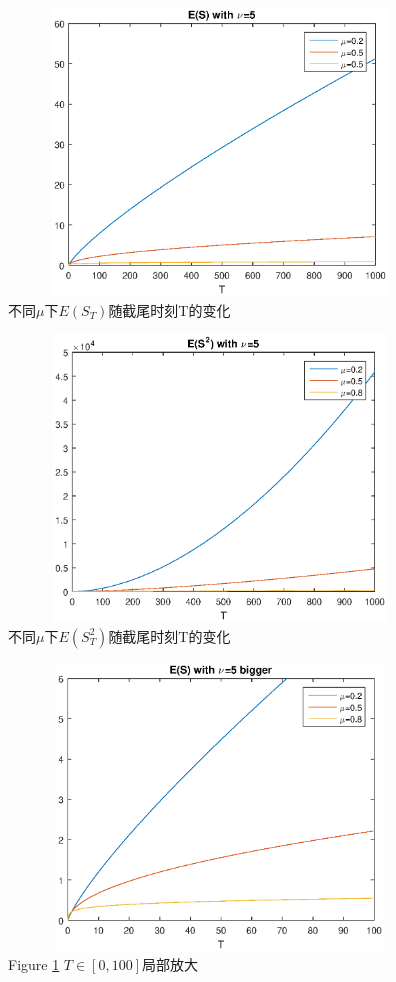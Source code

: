 \documentclass[a4paper, 12pt]{ctexart}
\begin{document}
\begin{figure}[H]
\centering
\includegraphics[width=5in,height=3in]{ES.eps}
\caption{不同$\mu$下$E(S_T)$随截尾时刻T的变化}
\label{fig:4}
\end{figure}
\bigskip


\begin{figure}[H]
\centering
\includegraphics[width=5in,height=3in]{ES2.eps}
\caption{不同$\mu$下$E(S_T^2)$随截尾时刻T的变化}
\label{fig:5}
\end{figure}
\bigskip


\begin{figure}[H]
\centering
\includegraphics[width=5in,height=3in]{ES_bigger.eps}
\caption{Figure \ref{fig:4} $T \in [0,100]$局部放大}
\label{fig:6}
\end{figure}
\bigskip
\end{document}
